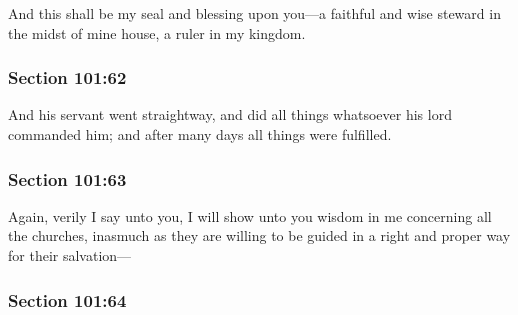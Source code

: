 		And this shall be my seal and blessing upon you---a faithful and wise steward in the midst of mine house, a ruler in my kingdom.


	\subsubsection{Section 101:62} %
		\label{DC101-62}

		And his servant went straightway, and did all things whatsoever his lord commanded him; and after many days all things were fulfilled.


	\subsubsection{Section 101:63} %
		\label{DC101-63}

		Again, verily I say unto you, I will show unto you wisdom in me concerning all the churches, inasmuch as they are willing to be guided in a right and proper way for their salvation---


	\subsubsection{Section 101:64} %
		\label{DC101-64}

